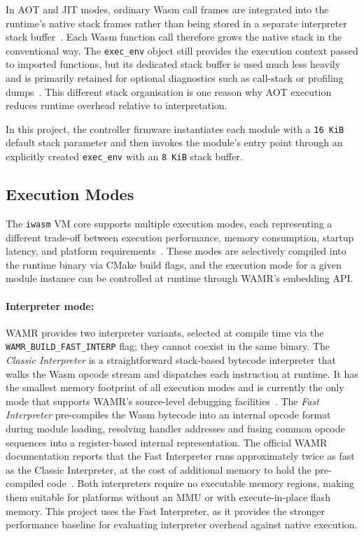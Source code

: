 \documentclass[12pt, a4paper]{report}
\begin{document}
In AOT and JIT modes, ordinary Wasm call frames are integrated into the runtime's native
stack frames rather than being stored in a separate interpreter stack buffer~\cite{wamr-stacks-blog}.
Each Wasm function call therefore grows the native stack in the conventional way. The
\texttt{exec\_env} object still provides the execution context passed to imported functions,
but its dedicated stack buffer is used much less heavily and is primarily retained for
optional diagnostics such as call-stack or profiling dumps~\cite{wamr-stacks-blog}. This
different stack organisation is one reason why AOT execution reduces runtime overhead
relative to interpretation.

In this project, the controller firmware instantiates each module with a \texttt{16~KiB}
default stack parameter and then invokes the module's entry point through an explicitly
created \texttt{exec\_env} with an \texttt{8~KiB} stack buffer. 

\subsection{Execution Modes}
\label{subsec:wamr-modes}

The \texttt{iwasm} VM core supports multiple execution modes, each representing a different
trade-off between execution performance, memory consumption, startup latency, and platform
requirements~\cite{wamr-running-modes-blog, wamr-running-modes-doc}. These modes are
selectively compiled into the runtime binary via CMake build flags, and the execution mode
for a given module instance can be controlled at runtime through WAMR's embedding API.

\paragraph{Interpreter mode:} WAMR provides two interpreter variants, selected at compile
time via the \texttt{WAMR\_BUILD\_FAST\_INTERP} flag; they cannot coexist in the same
binary. The \textit{Classic Interpreter} is a straightforward stack-based bytecode
interpreter that walks the Wasm opcode stream and dispatches each instruction at runtime. It
has the smallest memory footprint of all execution modes and is currently the only mode that
supports WAMR's source-level debugging facilities~\cite{wamr-running-modes-blog}. The
\textit{Fast Interpreter} pre-compiles the Wasm bytecode into an internal opcode format
during module loading, resolving handler addresses and fusing common opcode sequences into a
register-based internal representation. The official WAMR documentation reports that the
Fast Interpreter runs approximately twice as fast as the Classic Interpreter, at the cost of
additional memory to hold the pre-compiled code~\cite{wamr-running-modes-doc,
wamr-fast-interp}. Both interpreters require no executable memory regions, making them
suitable for platforms without an MMU or with execute-in-place flash memory. This project
uses the Fast Interpreter, as it provides the stronger performance baseline for evaluating
interpreter overhead against native execution.
\end{document}
